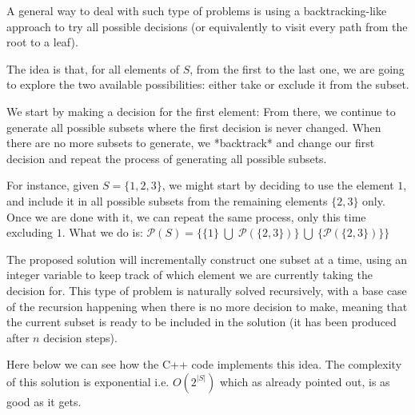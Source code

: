 A general way to deal with such type of problems is using a backtracking-like approach to try all possible
decisions (or equivalently to visit every path from the root to a leaf).

The idea is that, for all elements of $S$, from the first to the last one, we are going to
explore the two available possibilities: either take or exclude
it from the subset.

We start by making a decision for the first element: From there, we continue to generate all possible subsets
where the first decision is never changed. 
When there are no more subsets to generate, we *backtrack* and change our first
decision and repeat the process of generating all possible subsets.


For instance, given $S=\{1,2,3\}$, we might start by deciding to use the element $1$, and include it in all possible subsets from the remaining elements $\{2, 3\}$ only. 
Once we are done with it, we can repeat the same process, only this time excluding $1$. What we do is: $\mathcal{P}(S)= \{\{1\} \; \bigcup \;\mathcal{P}(\{2,3\})\} \: \bigcup \: \{\mathcal{P}(\{2,3\})\}\} 
$

The proposed solution will incrementally construct one subset at a time, 
using an integer variable to keep track of which element we are currently taking the decision for.
This type of problem is naturally solved recursively, with a base case of the recursion happening when there is no more decision
to make, meaning that the current subset is ready to be included in the solution (it has been
produced after $n$ decision steps).

Here below we can see how the C++ code implements this idea. The complexity of this solution is exponential i.e. $O(2^{|S|})$ which as already pointed out, is as good as
it gets.





